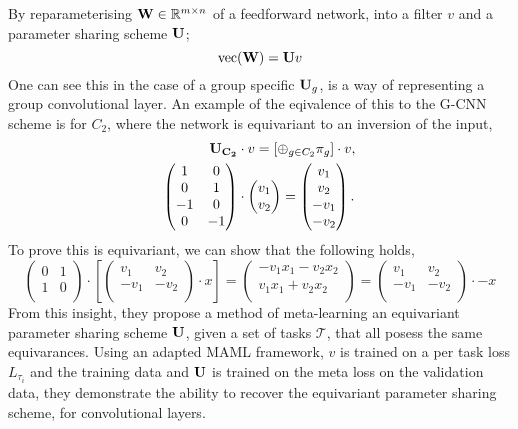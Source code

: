 By reparameterising $\mathbf{W} \in \mathbb{R}^{m \times n}$ of a feedforward network, into a filter $v$ and a parameter sharing scheme $\mathbf{U}$;
\begin{equation}
	\text{vec}(\mathbf{W}) = \mathbf{U}v
\end{equation}
One can see this in the case of a group specific $\mathbf{U}_g$, is a way of representing a group convolutional layer.
An example of the eqivalence of this to the G-CNN scheme is for $C_2$, where the network is equivariant to an inversion of the input,
\begin{align}
	\mathbf{U_{C_2}}   & \cdot v  = [\oplus_{g \in C_2} \pi_g] \cdot v, \\
	\begin{pmatrix}
		1  & 0  \\
		0  & 1  \\
		-1 & 0  \\
		0  & -1 \\
	\end{pmatrix} & \cdot
	\begin{pmatrix}
		v_1 \\
		v_2 \\
	\end{pmatrix}
	= \begin{pmatrix}
		  v_1  \\
		  v_2  \\
		  -v_1 \\
		  -v_2 \\
	  \end{pmatrix}.
\end{align}
To prove this is equivariant, we can show that the following holds,
\begin{equation}
	\begin{pmatrix}
		0 & 1 \\
		1 & 0 \\
	\end{pmatrix} \cdot \left[
		\begin{pmatrix}
			v_1  & v_2  \\
			-v_1 & -v_2 \\
		\end{pmatrix} \cdot x \right] = \begin{pmatrix}
		-v_1 x_1 - v_2 x_2 \\
		v_1 x_1 + v_2 x_2  \\
	\end{pmatrix}
	= \begin{pmatrix}
		v_1  & v_2  \\
		-v_1 & -v_2 \\
	\end{pmatrix} \cdot  -x
\end{equation}
From this insight, they propose a method of meta-learning an equivariant parameter sharing scheme $\mathbf{U}$, given a set of tasks $\mathcal{T}$, that all posess the same equivarances.
Using an adapted MAML framework, $v$ is trained on a per task loss $L_{\tau_i}$ and the training data and $\mathbf{U}$ is trained on the meta loss on the validation data, they demonstrate the ability to recover the equivariant parameter sharing scheme, for convolutional layers.


